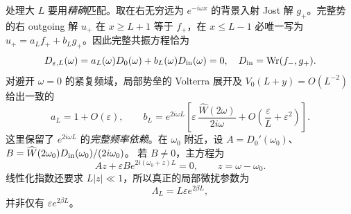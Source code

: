 \documentclass[UTF8,a4paper,11pt]{ctexart}
\DeclareMathOperator{\Wr}{Wr}
\newcommand{\ee}{\varepsilon}
\begin{document}
处理大 $L$ 要用\emph{精确}匹配。取在右无穷远为 $e^{-i\omega x}$ 的背景入射 Jost 解 $g_+$。完整势的右 outgoing 解 $u_+$ 在 $x\geq L+1$ 等于 $f_+$，在 $x\leq L-1$ 必唯一写为
$u_+=a_Lf_++b_Lg_+$。因此完整共振方程恰为
\begin{equation}\label{eq:exactmatch}
 D_{\ee,L}(\omega)
 =a_L(\omega)D_0(\omega)+b_L(\omega)D_{\rm in}(\omega)=0,
 \quad D_{\rm in}=\Wr(f_-,g_+).
\end{equation}
对避开 $\omega=0$ 的紧复频域，局部势垒的 Volterra 展开及
$V_0(L+y)=O(L^{-2})$ 给出一致的
\begin{equation}\label{eq:ab}
 a_L=1+O(\ee),\qquad
 b_L=e^{2i\omega L}
 \left[\ee\,\frac{\widehat W(2\omega)}{2i\omega}
 +O\!\left(\frac{\ee}{L}+\ee^2\right)\right].
\end{equation}
这里保留了 $e^{2i\omega L}$ 的\emph{完整频率依赖}。在 $\omega_0$ 附近，设
$A=D_0'(\omega_0)$、
$B=\widehat W(2\omega_0)D_{\rm in}(\omega_0)/(2i\omega_0)$。
若 $B\neq0$，主方程为
\begin{equation}\label{eq:normal}
 A z+\ee B e^{2i(\omega_0+z)L}=0,
 \qquad z=\omega-\omega_0.
\end{equation}
线性化指数还要求 $L|z|\ll1$，所以真正的局部微扰参数为
\begin{equation}\label{eq:param}
 \Lambda_L=L\ee e^{2\beta L},
\end{equation}
并非仅有 $\ee e^{2\beta L}$。
\end{document}
